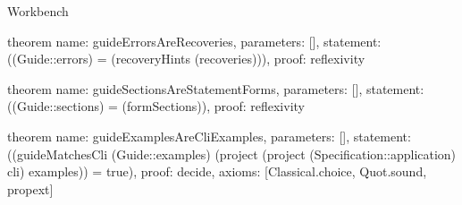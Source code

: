 \begin{lexlean}{Workbench}
\begin{semanticmodule}
theorem{
  name: guideErrorsAreRecoveries,
  parameters: [],
  statement: ((Guide::errors) = (recoveryHints (recoveries))),
  proof: reflexivity{}
}

theorem{
  name: guideSectionsAreStatementForms,
  parameters: [],
  statement: ((Guide::sections) = (formSections)),
  proof: reflexivity{}
}

theorem{
  name: guideExamplesAreCliExamples,
  parameters: [],
  statement: ((guideMatchesCli (Guide::examples) (project (project (Specification::application) cli) examples)) = true),
  proof: decide{},
  axioms: [Classical.choice, Quot.sound, propext]
}
\end{semanticmodule}
\end{lexlean}
